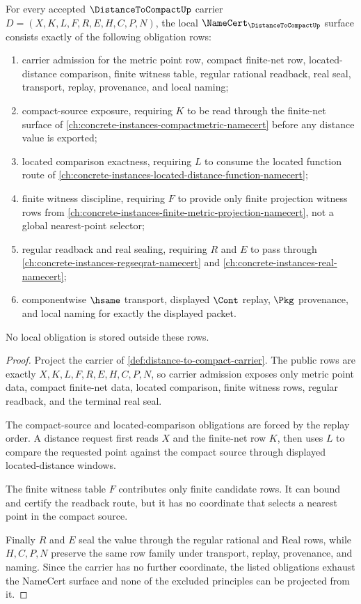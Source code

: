 \begin{theorem}
\label{thm:distance-to-compact-namecert-obligations}
For every accepted $\DistanceToCompactUp$ carrier $D=(X,K,L,F,R,E,H,C,P,N)$, the local $\NameCert_{\DistanceToCompactUp}$ surface consists exactly of the following obligation rows:
\begin{enumerate}
\item carrier admission for the metric point row, compact finite-net row, located-distance comparison, finite witness table, regular rational readback, real seal, transport, replay, provenance, and local naming;
\item compact-source exposure, requiring $K$ to be read through the finite-net surface of \autoref{ch:concrete-instances-compactmetric-namecert} before any distance value is exported;
\item located comparison exactness, requiring $L$ to consume the located function route of \autoref{ch:concrete-instances-located-distance-function-namecert};
\item finite witness discipline, requiring $F$ to provide only finite projection witness rows from \autoref{ch:concrete-instances-finite-metric-projection-namecert}, not a global nearest-point selector;
\item regular readback and real sealing, requiring $R$ and $E$ to pass through \autoref{ch:concrete-instances-regseqrat-namecert} and \autoref{ch:concrete-instances-real-namecert};
\item componentwise $\hsame$ transport, displayed $\Cont$ replay, $\Pkg$ provenance, and local naming for exactly the displayed packet.
\end{enumerate}
No local obligation is stored outside these rows.
\end{theorem}
\begin{proof}
Project the carrier of \autoref{def:distance-to-compact-carrier}. The public rows are exactly $X,K,L,F,R,E,H,C,P,N$, so carrier admission exposes only metric point data, compact finite-net data, located comparison, finite witness rows, regular readback, and the terminal real seal.

The compact-source and located-comparison obligations are forced by the replay order. A distance request first reads $X$ and the finite-net row $K$, then uses $L$ to compare the requested point against the compact source through displayed located-distance windows.

The finite witness table $F$ contributes only finite candidate rows. It can bound and certify the readback route, but it has no coordinate that selects a nearest point in the compact source.

Finally $R$ and $E$ seal the value through the regular rational and Real rows, while $H,C,P,N$ preserve the same row family under transport, replay, provenance, and naming. Since the carrier has no further coordinate, the listed obligations exhaust the NameCert surface and none of the excluded principles can be projected from it.
\end{proof}

